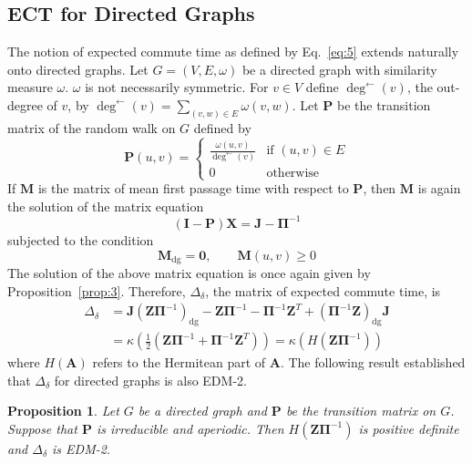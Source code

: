 \documentclass[10pt,twocolumn]{article}
\newtheorem{proposition}[theorem]{Proposition}
\numberwithin{equation}{section}
\begin{document}
\subsection{ECT for Directed Graphs}
\label{sec:ect-directed-graphs}
The notion of expected commute time as defined by Eq.~\eqref{eq:5}
extends naturally onto directed graphs. Let $G = (V,E,\omega)$ be a
directed graph with similarity measure $\omega$. $\omega$ is not
necessarily symmetric. For $v \in V$ define $\deg^{\leftarrow }(v)$,
the out-degree of $v$, by $\deg^{\leftarrow }(v) = \sum_{(v,w) \in
  E}{\omega(v,w)}$. Let $\mathbf{P}$ be the transition matrix of the
random walk on $G$ defined by
\begin{equation}
  \label{eq:26}
  \mathbf{P}(u,v) = \begin{cases}
    \tfrac{\omega(u,v)}{\deg^{\leftarrow }(v)} & \text{if $(u,v) \in E$} \\
    0 & \text{otherwise}
  \end{cases}
\end{equation}
If $\mathbf{M}$ is the matrix of mean first passage time with respect
to $\mathbf{P}$, then $\mathbf{M}$ is again the solution of the matrix equation
\begin{equation*}
   (\mathbf{I} - \mathbf{P})\mathbf{X} = \mathbf{J} - \bm{\Pi}^{-1}
\end{equation*}
subjected to the condition 
\begin{equation*}
 \mathbf{M}_{\mathrm{dg}} = \mathbf{0}, \qquad \mathbf{M}(u,v) \geq 0   
\end{equation*}
The solution of the above matrix equation is once again given by
Proposition~\ref{prop:3}. Therefore, $\Delta_{\delta}$, the matrix of expected
commute time, is 
\begin{equation}
  \label{eq:27}
  \begin{split}
    \Delta_\delta &= \mathbf{J}(\mathbf{Z}\bm{\Pi}^{-1})_{\mathrm{dg}}
    - \mathbf{Z}\bm{\Pi}^{-1} - \bm{\Pi}^{-1}\mathbf{Z}^{T} +
    (\bm{\Pi}^{-1}\mathbf{Z})_{\mathrm{dg}}\mathbf{J} \\ \ &=
    \kappa(\tfrac{1}{2}(\mathbf{Z}\bm{\Pi}^{-1} +
    \mathbf{\Pi}^{-1}\mathbf{Z}^{T})) =
    \kappa(H(\mathbf{Z}\bm{\Pi}^{-1}))
  \end{split}
\end{equation}
where $H(\mathbf{A})$ refers to the Hermitean part of $\mathbf{A}$.
The following result established that $\Delta_{\delta}$ for directed
graphs is also EDM-2. 
\begin{proposition}
  \label{prop:10}
  Let $G$ be a directed graph and $\mathbf{P}$ be the transition
  matrix on $G$. Suppose that $\mathbf{P}$ is irreducible and
  aperiodic. Then $H(\mathbf{Z}\bm{\Pi}^{-1})$ is positive
  definite and $\Delta_{\delta}$ is EDM-2.
\end{proposition}
\end{document}
